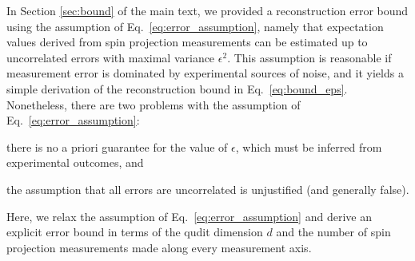 \documentclass[notitlepage,twocolumn]{revtex4-2}
\newcommand{\1}{\mathds{1}}
\begin{document}
In Section \ref{sec:bound} of the main text, we provided a reconstruction error bound using the assumption of Eq.~\eqref{eq:error_assumption}, namely that expectation values derived from spin projection measurements can be estimated up to uncorrelated errors with maximal variance $\epsilon^2$.
This assumption is reasonable if measurement error is dominated by experimental sources of noise, and it yields a simple derivation of the reconstruction bound in Eq.~\eqref{eq:bound_eps}.
Nonetheless, there are two problems with the assumption of Eq.~\eqref{eq:error_assumption}:
\begin{enumerate*}
\item there is no a priori guarantee for the value of $\epsilon$, which must be inferred from experimental outcomes, and
\item the assumption that all errors are uncorrelated is unjustified (and generally false).
\end{enumerate*}
Here, we relax the assumption of Eq.~\eqref{eq:error_assumption} and derive an explicit error bound in terms of the qudit dimension $d$ and the number of spin projection measurements made along every measurement axis.
\end{document}

